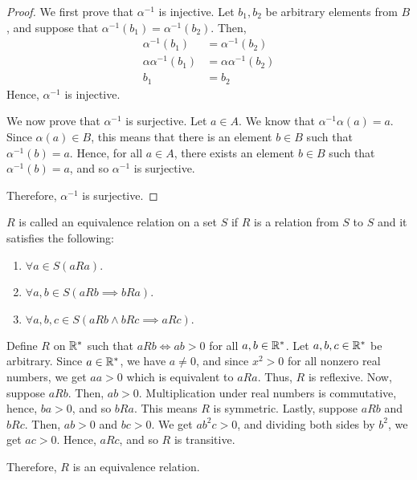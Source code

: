     \begin{proof}
        We first prove that \(\alpha^{-1}\) is injective. Let \(b_1, b_2\) be arbitrary elements from \(B\), and suppose that \(\alpha^{-1}(b_1) = \alpha^{-1}(b_2)\). Then,
        \begin{align*}
            \alpha^{-1}(b_1) &= \alpha^{-1}(b_2) \\
            \alpha\alpha^{-1}(b_1) &= \alpha\alpha^{-1}(b_2) \\
            b_1 &= b_2
        \end{align*}
        Hence, \(\alpha^{-1}\) is injective.

        We now prove that \(\alpha^{-1}\) is surjective. Let \(a\in A\). We know that \(\alpha^{-1}\alpha(a) = a\). Since \(\alpha(a)\in B\), this means that there is an element \(b\in B\) such that \(\alpha^{-1}(b) = a\). Hence, for all \(a\in A\), there exists an element \(b\in B\) such that \(\alpha^{-1}(b) = a\), and so \(\alpha^{-1}\) is surjective.

        Therefore, \(\alpha^{-1}\) is surjective.
    \end{proof}

    \begin{dfn}
        \(R\) is called an equivalence relation on a set \(S\) if \(R\) is a relation from \(S\) to \(S\) and it satisfies the following:
        \begin{enumerate}
            \item \(\forall a\in S (aRa)\).
            \item \(\forall a,b\in S (aRb \implies bRa)\).
            \item \(\forall a,b,c\in S (aRb \land bRc \implies aRc).\)
        \end{enumerate}
    \end{dfn}
    
    \begin{example}
        Define \(R\) on \(\mathbb{R}^*\) such that \(aRb \iff ab > 0\) for all \(a,b\in\mathbb{R}^*\). Let \(a,b,c\in\mathbb{R}^*\) be arbitrary. Since \(a\in\mathbb{R}^*\), we have \(a \neq 0\), and since \(x^2 > 0\) for all nonzero real numbers, we get \(aa > 0\) which is equivalent to \(aRa\). Thus, \(R\) is reflexive. Now, suppose \(aRb\). Then, \(ab > 0\). Multiplication under real numbers is commutative, hence, \(ba > 0\), and so \(bRa\). This means \(R\) is symmetric. Lastly, suppose \(aRb\) and \(bRc\). Then, \(ab > 0\) and \(bc > 0\). We get \(ab^2 c > 0\), and dividing both sides by \(b^2\), we get \(ac > 0\). Hence, \(aRc\), and so \(R\) is transitive.

        Therefore, \(R\) is an equivalence relation.
    \end{example}
    
